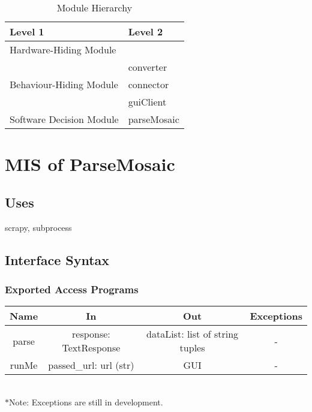 \documentclass[12pt, titlepage]{article}
\begin{document}
\begin{table}[h!]
\centering
\begin{tabular}{p{} p{}}
\toprule
\textbf{Level 1} & \textbf{Level 2}\\
\midrule

{Hardware-Hiding Module} & ~ \\
\midrule

\multirow{3}{0.3\textwidth}{Behaviour-Hiding Module} & converter\\
& connector\\
& guiClient\\
\midrule

\multirow{1}{0.3\textwidth}{Software Decision Module} & parseMosaic\\
\bottomrule

\end{tabular}
\caption{Module Hierarchy}
\label{TblMH}
\end{table}
\newpage

\section{MIS of ParseMosaic} \label{SecM2}
\subsection{Uses}
scrapy, subprocess
\subsection{Interface Syntax}
\subsubsection{Exported Access Programs}
\begin{tabular}[pos]{|c|c|c|c|}
	\hline
	\textbf{Name}& \textbf{In} & \textbf{Out} & \textbf{Exceptions} \\ \hline
	parse & response: TextResponse & dataList: list of string tuples & -\\ \hline %
	runMe & passed\_url: url (str) & GUI & -\\ \hline
			
\end{tabular}\\
$*$Note: Exceptions are still in development.
\end{document}
